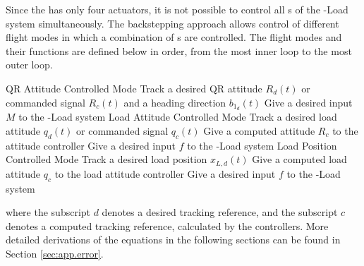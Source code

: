 Since the  has only four actuators, it is not possible to control all s of the -Load system simultaneously. The backstepping approach allows control of different flight modes in which a combination of s are controlled. The flight modes and their functions are defined below in order, from the most inner loop to the most outer loop.
\begin{outline}
	\1 QR Attitude Controlled Mode 
	\2 Track a desired QR attitude $ R_d(t) $ or commanded signal $ R_c(t) $ and a heading direction $ b_{1_d}(t) $
	\2 Give a desired input $ M $ to the -Load system
	\1 Load Attitude Controlled Mode 
	\2 Track a desired load attitude $ q_d(t) $ or commanded signal $ q_c(t) $
	\2 Give a computed  attitude $ R_c $ to the  attitude controller
	\2 Give a desired input $ f $ to the -Load system	
	\1 Load Position Controlled Mode
	\2 Track a desired load position $ x_{L,d}(t) $
	\2 Give a computed load attitude $ q_c $ to the load attitude controller
	\2 Give a desired input $ f $ to the -Load system		
\end{outline}
where the subscript $d $ denotes a desired tracking reference, and the subscript $ c $ denotes a computed tracking reference, calculated by the controllers. 
More detailed derivations of the equations in the following sections can be found in Section \ref{sec:app.error}.


